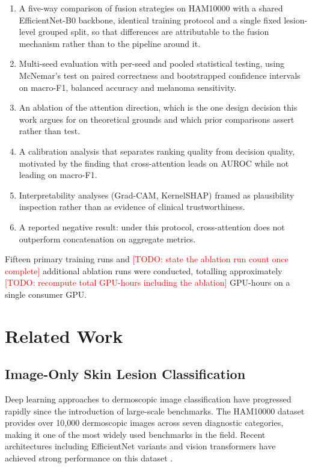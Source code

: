 \documentclass[conference]{IEEEtran}
\newcommand{\TODO}[1]{\textcolor{red}{[TODO: #1]}}
\begin{document}
\begin{enumerate}
\item A five-way comparison of fusion strategies on HAM10000 with a shared EfficientNet-B0 backbone, identical training protocol and a single fixed lesion-level grouped split, so that differences are attributable to the fusion mechanism rather than to the pipeline around it.
\item Multi-seed evaluation with per-seed and pooled statistical testing, using McNemar's test on paired correctness and bootstrapped confidence intervals on macro-F1, balanced accuracy and melanoma sensitivity.
\item An ablation of the attention direction, which is the one design decision this work argues for on theoretical grounds and which prior comparisons assert rather than test.
\item A calibration analysis that separates ranking quality from decision quality, motivated by the finding that cross-attention leads on AUROC while not leading on macro-F1.
\item Interpretability analyses (Grad-CAM, KernelSHAP) framed as plausibility inspection rather than as evidence of clinical trustworthiness.
\item A reported negative result: under this protocol, cross-attention does not outperform concatenation on aggregate metrics.
\end{enumerate}

Fifteen primary training runs and \TODO{state the ablation run count once complete} additional ablation runs were conducted, totalling approximately \TODO{recompute total GPU-hours including the ablation} GPU-hours on a single consumer GPU.

\section{Related Work}
\label{sec:related_work}

\subsection{Image-Only Skin Lesion Classification}

Deep learning approaches to dermoscopic image classification have progressed rapidly since the introduction of large-scale benchmarks. The HAM10000 dataset \citep{tschandl2018ham10000} provides over 10,000 dermoscopic images across seven diagnostic categories, making it one of the most widely used benchmarks in the field. Recent architectures including EfficientNet variants and vision transformers have achieved strong performance on this dataset \citep{ieracitano2025robust, wu2025dsscc}.
\end{document}
